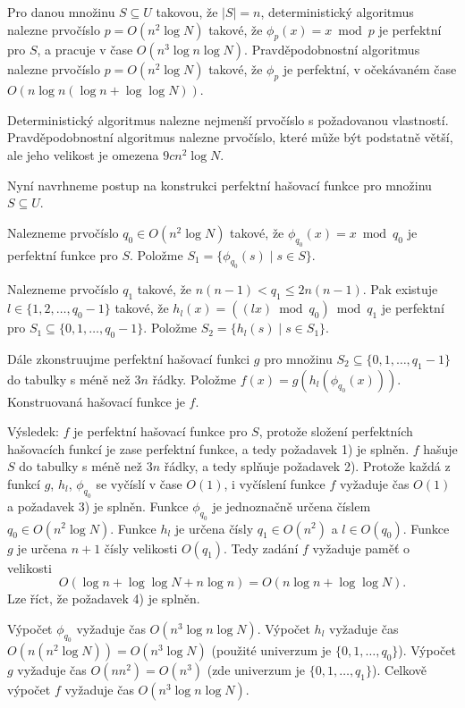 \documentclass[a4paper,12pt]{article}
\begin{document}
Pro danou množinu $S\subseteq U$ takovou, že 
$|S|=n$, deterministický algoritmus nalezne prvočíslo 
$p=O(n^2\log N)$ takové, že $\phi_p(x)=x\bmod p$ je perfektní 
pro $S$, a pracuje v čase $O(n^3\log n\log N)$. Pravděpodobnostní 
algoritmus nalezne pr\-vočíslo $p=O(n^2\log N)$ takové, že 
$\phi_p$ je perfektní, v očekáva\-ném čase 
$O(n\log n(\log n+\log\log N))$.
\endproclaim

Deterministický algoritmus nalezne nejmenší prvočíslo s 
po\-ža\-dovanou vlastností.  Prav\-dě\-podobnostní algoritmus 
nalezne prvočíslo, které může být podstatně 
větší, ale jeho velikost je omezena $9cn^2\log N$. 

Nyní navrhneme postup na konstrukci perfektní 
hašovací funk\-ce pro množinu $S\subseteq U$.

\roster
\item
Nalezneme prvočíslo $q_0\in O(n^2\log N)$ takové, že 
$\phi_{q_0}(x)=x\bmod q_0$ je perfektní funkce pro $S$. Položme 
$S_1=\{\phi_{q_0}(s)\mid s\in S\}$.
\item
Nalezneme prvočíslo $q_1$ takové, že 
$n(n-1)<q_1\le 2n(n-1)$. Pak existuje 
$l\in \{1,2,\dots,q_0-1\}$ takové, že $h_l(x)=((lx)\bmod q_0
)\bmod q_1$ 
je perfektní pro $S_1\subseteq \{0,1,\dots,q_0-1\}$. Položme 
$S_2=\{h_l(s)\mid s\in S_1\}$.
\item
Dále zkonstruujme perfektní hašovací funkci 
$g$ pro množinu 
$S_2\subseteq \{0,1,\dots,q_1-1\}$ do tabulky s méně než $
3n$ řádky. 
Položme $f(x)=g(h_l(\phi_{q_0}(x)))$. Konstruovaná hašovací 
funkce je $f$.
\endroster

Výsledek: $f$ je perfektní hašovací funkce pro $
S$, protože 
složení perfektních hašovacích funkcí je zase perfektní 
funkce, a tedy požadavek 1) je splněn. \newline 
$f$ hašuje $S$ do tabulky s méně než $3n$ řádky, a tedy 
splňuje požadavek 2). \newline 
Protože každá z funkcí $g$, $h_l$, $\phi_{q_0}$ se vyčíslí v čase $
O(1)$, 
i vyčíslení funkce $f$ vyžaduje čas $O(1)$ a požadavek 3) je 
splněn.\newline 
Funkce $\phi_{q_0}$ je jednoznačně určena číslem $
q_0\in O(n^2\log N)$. 
Funkce $h_l$ je určena čísly $q_1\in O(n^2)$ a $l\in O(
q_0)$. Funkce $g$ 
je určena $n+1$ čísly velikosti $O(q_1)$. Tedy zadání $
f$ 
vyžaduje pamě\v t o velikosti 
$$O(\log n+\log\log N+n\log n)=O(n\log n+\log\log N).$$
Lze říct, že požadavek 4) je splněn. 

Výpočet $\phi_{q_0}$ vyžaduje čas $O(n^3\log 
n\log N)$. Výpočet $h_l$ 
vyža\-du\-je čas $O(n(n^2\log N))=O(n^3\log N)$ (použité univerzum je 
$\{0,1,\dots,q_0\}$). Výpočet $g$ vyžaduje čas $O(nn^2
)=O(n^3)$ 
(zde univerzum je $\{0,1,\dots,q_1\}$). Celkově 
výpočet $f$ vyžaduje čas $O(n^3\log n\log N)$.
\end{document}
